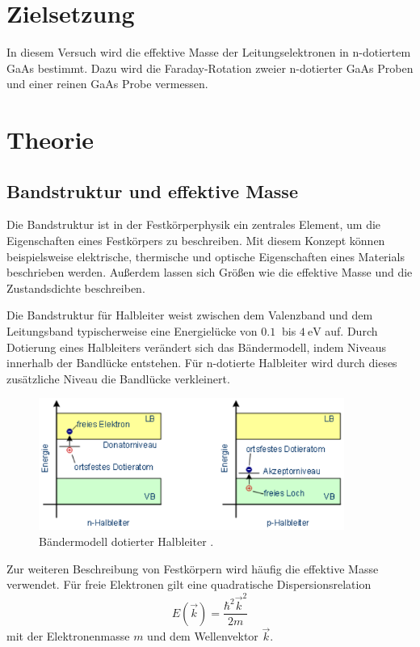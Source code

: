 
\section{Zielsetzung}
In diesem Versuch wird die effektive Masse der Leitungselektronen in n-dotiertem GaAs bestimmt.
Dazu wird die Faraday-Rotation zweier n-dotierter GaAs Proben und einer reinen GaAs Probe vermessen.

\section{Theorie}
\subsection{Bandstruktur und effektive Masse}

Die Bandstruktur ist in der Festkörperphysik ein zentrales Element, um die Eigenschaften
eines Festkörpers zu beschreiben. Mit diesem Konzept können beispielsweise elektrische, thermische
und optische Eigenschaften eines Materials beschrieben werden. Außerdem lassen sich Größen wie die
effektive Masse und die Zustandsdichte beschreiben.

Die Bandstruktur für Halbleiter weist zwischen dem Valenzband und dem Leitungsband typischerweise
eine Energielücke von $\SI{0,1}{}$ bis $\SI{4}{\eV}$ auf. Durch Dotierung eines Halbleiters
verändert sich das Bändermodell, indem Niveaus innerhalb der Bandlücke entstehen.
Für n-dotierte Halbleiter wird durch dieses zusätzliche Niveau die Bandlücke verkleinert.

\begin{figure}[H]
  \centering
  \includegraphics[width=10cm]{Bandstruktur.png}
  \caption{Bändermodell dotierter Halbleiter \cite{halbleiter}.}
  \label{fig:Band}
\end{figure}

Zur weiteren Beschreibung von Festkörpern wird häufig die effektive Masse verwendet.
Für freie Elektronen gilt eine quadratische Dispersionsrelation
\begin{equation}
  E(\vec{k})=\frac{\hbar^2 \vec{k}^2}{2m}
\end{equation}
mit der Elektronenmasse $m$ und dem Wellenvektor $\vec{k}$.

